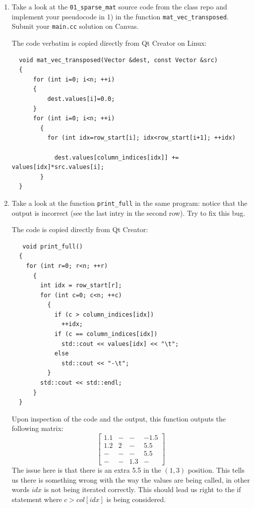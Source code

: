 \documentclass[12pt]{article}
\newcommand{\bmat}[1]{\begin{bmatrix} #1 \end{bmatrix}}
\numberwithin{equation}{section}
\begin{document}
\begin{enumerate}
\item Take a look at the \texttt{01\_sparse\_mat} source code from the class repo and implement your pseudocode in 1) in the function \texttt{mat\_vec\_transposed}.  Submit your \texttt{main.cc} solution on Canvas.

\begin{tcolorbox}[breakable]
The code verbatim is copied directly from Qt Creator on Linux:

\begin{verbatim}
  void mat_vec_transposed(Vector &dest, const Vector &src)
  {
      for (int i=0; i<n; ++i)
      {
          dest.values[i]=0.0;
      }
      for (int i=0; i<n; ++i)
        {
          for (int idx=row_start[i]; idx<row_start[i+1]; ++idx)

            dest.values[column_indices[idx]] += values[idx]*src.values[i];
        }
  }
\end{verbatim}
\end{tcolorbox}


\item Take a look at the function \texttt{print\_full} in the same program: notice that the output is incorrect (see the last intry in the second row).  Try to fix this bug.

\begin{tcolorbox}
The code is copied directly from Qt Creator:

\begin{verbatim}
   void print_full()
  {
    for (int r=0; r<n; ++r)
      {
        int idx = row_start[r];
        for (int c=0; c<n; ++c)
          {
            if (c > column_indices[idx])
              ++idx;
            if (c == column_indices[idx])
              std::cout << values[idx] << "\t";
            else
              std::cout << "-\t";
          }
        std::cout << std::endl;
      }
  }
\end{verbatim}

Upon inspection of the code and the output, this function outputs the following matrix:
$$\bmat{1.1 & - & - & -1.5\\ 1.2&2&-&5.5\\-&-&-&5.5\\-&-&1.3&-}$$
The issue here is that there is an extra 5.5 in the $(1,3)$ position.  This tells us there is something wrong with the way the values are being called, in other words $idx$ is not being iterated correctly.  This should lead us right to the if statement where $c>col[idx]$ is being considered.


\end{tcolorbox}
\end{enumerate}
\end{document}
